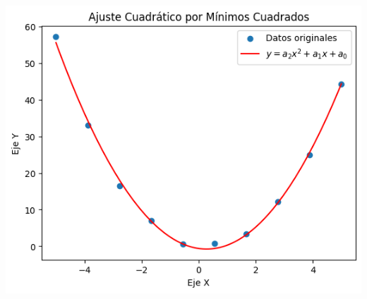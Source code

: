 \documentclass[
  letterpaper,
  DIV=11,
  numbers=noendperiod]{scrartcl}
\begin{document}
\includegraphics{determinante_files/figure-pdf/cell-6-output-2.png}
\end{document}
